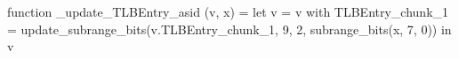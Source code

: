 function _update_TLBEntry_asid (v, x) = let v = { v with TLBEntry_chunk_1 = update_subrange_bits(v.TLBEntry_chunk_1, 9, 2, subrange_bits(x, 7, 0)) } in
  v
